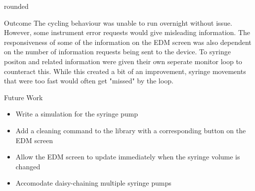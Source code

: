 \documentclass[a0paper,landscape,fontscale=0.32]{baposter}
\begin{document}
\begin{poster}
\begin{posterbox}[name=edmimage,column=3,below=edmscreens,headerfont={},headershape=rounded,boxheaderheight=0em,boxColorOne=white,borderColor=white]{rounded}
\begin{figure}[H]
\begin{center}
\vspace{-1.2em}
\end{center}
\end{figure}
\end{posterbox}
\begin{posterbox}[name=outcome,column=3,below=edmimage]{Outcome}
The cycling behaviour was unable to run overnight without issue. However, some instrument error requests would
give misleading information. The responsiveness of some of the information on the EDM screen was also
    dependent on the number of information requests being sent to the device. To syringe positon and related
    information were given their own seperate monitor loop to counteract this. While this created a bit of an
    improvement, syringe movements that were too fast would often get "missed" by the loop. 
\end{posterbox}
\begin{posterbox}[name=futurework,column=3,above=bottom]{Future Work}
 \begin{itemize}
    \item Write a simulation for the syringe pump
    \item Add a cleaning command to the library with a corresponding button on the EDM screen
    \item Allow the EDM screen to update immediately when the syringe volume is changed
    \item Accomodate daisy-chaining multiple syringe pumps
\end{itemize}
\end{posterbox}

\end{poster}
\end{document}
